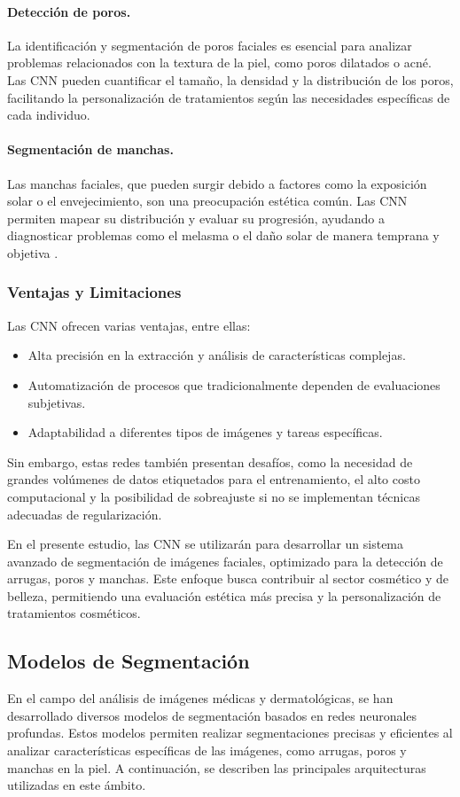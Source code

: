 \paragraph{Detección de poros.}  
La identificación y segmentación de poros faciales es esencial para analizar problemas relacionados con la textura de la piel, como poros dilatados o acné. Las CNN pueden cuantificar el tamaño, la densidad y la distribución de los poros, facilitando la personalización de tratamientos según las necesidades específicas de cada individuo.

\paragraph{Segmentación de manchas.}  
Las manchas faciales, que pueden surgir debido a factores como la exposición solar o el envejecimiento, son una preocupación estética común. Las CNN permiten mapear su distribución y evaluar su progresión, ayudando a diagnosticar problemas como el melasma o el daño solar de manera temprana y objetiva \cite{autor2020imagen}.

\subsubsection{Ventajas y Limitaciones}  
Las CNN ofrecen varias ventajas, entre ellas:
\begin{itemize}
    \item Alta precisión en la extracción y análisis de características complejas.
    \item Automatización de procesos que tradicionalmente dependen de evaluaciones subjetivas.
    \item Adaptabilidad a diferentes tipos de imágenes y tareas específicas.
\end{itemize}

Sin embargo, estas redes también presentan desafíos, como la necesidad de grandes volúmenes de datos etiquetados para el entrenamiento, el alto costo computacional y la posibilidad de sobreajuste si no se implementan técnicas adecuadas de regularización.

En el presente estudio, las CNN se utilizarán para desarrollar un sistema avanzado de segmentación de imágenes faciales, optimizado para la detección de arrugas, poros y manchas. Este enfoque busca contribuir al sector cosmético y de belleza, permitiendo una evaluación estética más precisa y la personalización de tratamientos cosméticos.


\subsection{Modelos de Segmentación}  
En el campo del análisis de imágenes médicas y dermatológicas, se han desarrollado diversos modelos de segmentación basados en redes neuronales profundas. Estos modelos permiten realizar segmentaciones precisas y eficientes al analizar características específicas de las imágenes, como arrugas, poros y manchas en la piel. A continuación, se describen las principales arquitecturas utilizadas en este ámbito.

